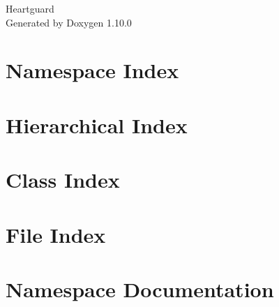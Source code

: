 \documentclass[twoside]{book}
\newcommand{\+}{\discretionary{\mbox{\scriptsize$\hookleftarrow$}}{}{}}
\newcommand{\clearemptydoublepage}{%
    \newpage{\pagestyle{empty}\cleardoublepage}%
  }
\begin{document}
  \raggedbottom
    \hypersetup{pageanchor=false,
                bookmarksnumbered=true,
                pdfencoding=unicode
               }
  \begin{titlepage}
  \vspace*{7cm}
  \begin{center}%
  {\Large Heartguard}\\
  \vspace*{1cm}
  {\large Generated by Doxygen 1.10.0}\\
  \end{center}
  \end{titlepage}
  \clearemptydoublepage
  \tableofcontents
  \clearemptydoublepage
  \hypersetup{pageanchor=true}

\chapter{Namespace Index}

\chapter{Hierarchical Index}

\chapter{Class Index}

\chapter{File Index}

\chapter{Namespace Documentation}



\end{document}

